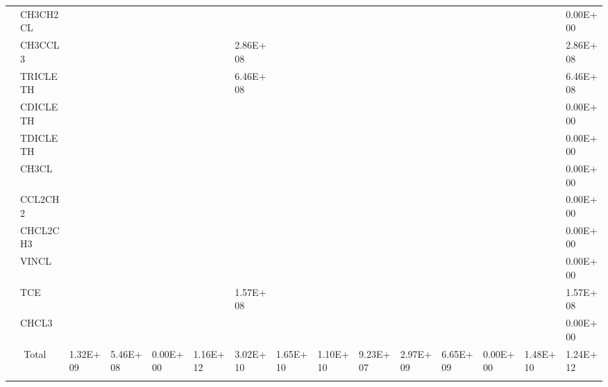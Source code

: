 \begin{longtable}{lllllllllllllll}
	 & CH3CH2CL &  &  &  &  &  &  &  &  &  &  &  &  & 0.00E+00 \\
	 & CH3CCL3 &  &  &  &  & 2.86E+08 &  &  &  &  &  &  &  & 2.86E+08 \\
	 & TRICLETH &  &  &  &  & 6.46E+08 &  &  &  &  &  &  &  & 6.46E+08 \\
	 & CDICLETH &  &  &  &  &  &  &  &  &  &  &  &  & 0.00E+00 \\
	 & TDICLETH &  &  &  &  &  &  &  &  &  &  &  &  & 0.00E+00 \\
	 & CH3CL &  &  &  &  &  &  &  &  &  &  &  &  & 0.00E+00 \\
	 & CCL2CH2 &  &  &  &  &  &  &  &  &  &  &  &  & 0.00E+00 \\
	 & CHCL2CH3 &  &  &  &  &  &  &  &  &  &  &  &  & 0.00E+00 \\
	 & VINCL &  &  &  &  &  &  &  &  &  &  &  &  & 0.00E+00 \\
	 & TCE &  &  &  &  & 1.57E+08 &  &  &  &  &  &  &  & 1.57E+08 \\
	 & CHCL3 &  &  &  &  &  &  &  &  &  &  &  &  & 0.00E+00 \\
	\hline \multicolumn{2}{c}{Total}  & 1.32E+09 & 5.46E+08 & 0.00E+00 & 1.16E+12 & 3.02E+10 & 1.65E+10 & 1.10E+10 & 9.23E+07 & 2.97E+09 & 6.65E+09 & 0.00E+00 & 1.48E+10 & 1.24E+12 \\
	\hline \hline
	\label{t:Luxembourg_MCM_emissions}
\end{longtable}
